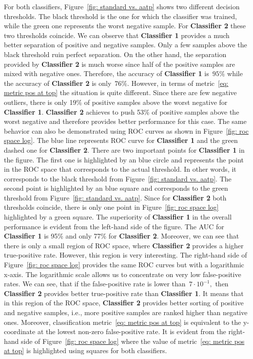 For both classifiers, Figure~\ref{fig: standard vs. aatp} shows two different decision thresholds. The black threshold is the one for which the classifier was trained, while the green one represents the worst negative sample. For \textbf{Classifier 2} these two thresholds coincide. We can observe that \textbf{Classifier 1} provides a much better separation of positive and negative samples. Only a few samples above the black threshold ruin perfect separation. On the other hand, the separation provided by \textbf{Classifier 2} is much worse since half of the positive samples are mixed with negative ones. Therefore, the accuracy of \textbf{Classifier 1} is~$95\%$ while the accuracy of \textbf{Classifier 2} is only~$76\%.$ However, in terms of metric~\eqref{eq: metric pos at top} the situation is quite different. Since there are few negative outliers, there is only 19\% of positive samples above the worst negative for \textbf{Classifier 1}. \textbf{Classifier 2} achieves to push 53\% of positive samples above the worst negative and therefore provides better performance for this case. The same behavior can also be demonstrated using ROC curves as shown in Figure~\ref{fig: roc space log}. The blue line represents ROC curve for \textbf{Classifier 1} and the green dashed one for \textbf{Classifier 2}. There are two important points for \textbf{Classifier 1} in the figure. The first one is highlighted by an blue circle and represents the point in the ROC space that corresponds to the actual threshold. In other words, it corresponds to the black threshold from Figure~\ref{fig: standard vs. aatp}. The second point is highlighted by an blue square and corresponds to the green threshold from Figure~\ref{fig: standard vs. aatp}. Since for \textbf{Classifier 2} both thresholds coincide, there is only one point in Figure~\ref{fig: roc space log} highlighted by a green square. The superiority of \textbf{Classifier 1} in the overall performance is evident from the left-hand side of the figure. The AUC for \textbf{Classifier 1} is 95\% and only 77\% for \textbf{Classifier 2}. Moreover, we can see that there is only a small region of ROC space, where \textbf{Classifier 2} provides a higher true-positive rate. However, this region is very interesting. The right-hand side of Figure~\ref{fig: roc space log} provides the same ROC curves but with a logarithmic x-axis. The logarithmic scale allows us to concentrate on very low false-positive rates. We can see, that if the false-positive rate is lower than~$7 \cdot 10^{-1},$ then \textbf{Classifier 2} provides better true-positive rate than \textbf{Classifier 1}. It means that in this region of the ROC space, \textbf{Classifier 2} provides better sorting of positive and negative samples, i.e., more positive samples are ranked higher than negative ones. Moreover, classification metric~\eqref{eq: metric pos at top} is equivalent to the y-coordinate at the lowest non-zero false-positive rate. It is evident from the right-hand side of Figure~\ref{fig: roc space log} where the value of metric~\eqref{eq: metric pos at top} is highlighted using squares for both classifiers.


